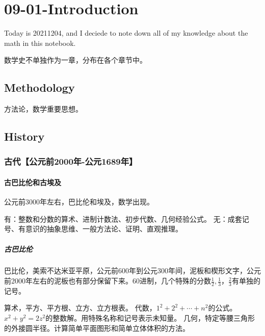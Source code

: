 

\chapter{09-01-Introduction}
Today is 20211204, and I deciede to note down all of my knowledge about the math in this notebook.


数学史不单独作为一章，分布在各个章节中。

\section{Methodology}
方法论，数学重要思想。


\section{History}

\subsection{古代【公元前2000年-公元1689年】}


\subsubsection{古巴比伦和古埃及}

公元前3000年左右，巴比伦和埃及，数学出现。

有：整数和分数的算术、进制计数法、初步代数、几何经验公式。
无：成套记号、有意识的抽象思维、一般方法论、证明、直观推理。

\paragraph{古巴比伦}

巴比伦，美索不达米亚平原，公元前600年到公元300年间，泥板和楔形文字，公元前2000年左右的泥板也有部分保留下来。60进制，几个特殊的分数$\frac{1}{2},\frac{1}{3}，\frac{2}{3}$有单独的记号。

算术，平方、平方根、立方、立方根表。
代数，$1^2 + 2^2 + \cdots + n^2$的公式。$x^2 + y^2 = 2z^2$的整数解。用特殊名称和记号表示未知量。
几何，特定等腰三角形的外接圆半径。计算简单平面图形和简单立体体积的方法。

